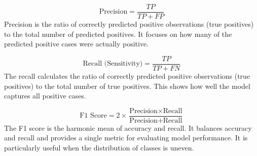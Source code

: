 \[
\text{Precision} = \frac{TP}{TP + FP}
\]
\indent Precision is the ratio of correctly predicted positive observations (true positives) to the total number of predicted positives. It focuses on how many of the predicted positive cases were actually positive.

\[
\text{Recall (Sensitivity)} = \frac{TP}{TP + FN}
\]
\indent The recall calculates the ratio of correctly predicted positive observations (true positives) to the total number of true positives. This shows how well the model captures all positive cases.

\[
\text{F1 Score} = 2 \times \frac{\text{Precision} \times \text{Recall}}{\text{Precision} + \text{Recall}}
\]
\indent The F1 score is the harmonic mean of accuracy and recall. It balances accuracy and recall and provides a single metric for evaluating model performance. It is particularly useful when the distribution of classes is uneven.